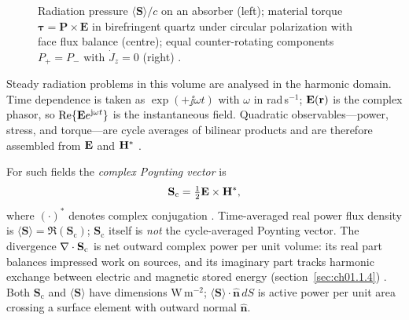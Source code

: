 \begin{figure}[t]
\centering
\VolIPhysFig{\VolIPhysThreeRadiationConsequences}
\caption{Radiation pressure $\langle\mathbf{S}\rangle/c$ on an absorber (left); material torque $\boldsymbol{\tau}=\mathbf P\times\mathbf E$ in birefringent quartz under circular polarization with face flux balance (centre); equal counter-rotating components $P_+=P_-$ with $\dot J_z{=}0$ (right) \cite{poynting1884,beth1936,allen1992}.}
\label{fig:ch1.three-radiation-consequences}
\end{figure}

Steady radiation problems in this volume are analysed in the harmonic domain. Time dependence is taken as $\exp(+\jj\omega t)$ with $\omega$ in rad\,s$^{-1}$; $\mathbf{E}(\mathbf{r})$ is the complex phasor, so $\Re\{\mathbf{E} e^{\mathrm{j}\omega t}\}$ is the instantaneous field. Quadratic observables---power, stress, and torque---are cycle averages of bilinear products and are therefore assembled from $\mathbf{E}$ and $\mathbf{H}^*$ \cite{stratton1941,harrington2001}.

For such fields the \emph{complex Poynting vector} is
\begin{equation}
\label{eq:ch1.intro-poynting}
\mathbf{S}_\mathrm{c}=\tfrac{1}{2}\mathbf{E}\times\mathbf{H}^*,
\end{equation}
where $(\cdot)^*$ denotes complex conjugation \cite{poynting1884,stratton1941}.
Time-averaged real power flux density is $\langle\mathbf{S}\rangle=\Re(\mathbf{S}_\mathrm{c})$;
$\mathbf{S}_\mathrm{c}$ itself is \emph{not} the cycle-averaged Poynting vector.
The divergence $\nabla\cdot\mathbf{S}_\mathrm{c}$ is net outward complex power per unit volume:
its real part balances impressed work on sources, and its imaginary part tracks harmonic
exchange between electric and magnetic stored energy (section~\ref{sec:ch01.1.4})
\cite{stratton1941}. Both $\mathbf{S}_\mathrm{c}$ and $\langle\mathbf{S}\rangle$ have
dimensions W\,m$^{-2}$; $\langle\mathbf{S}\rangle\cdot\hat{\mathbf{n}}\,dS$ is active
power per unit area crossing a surface element with outward normal $\hat{\mathbf{n}}$.

